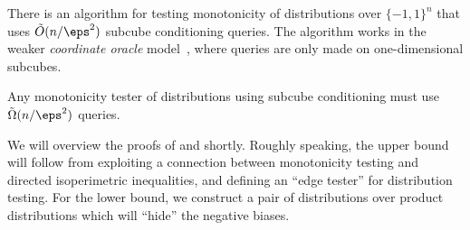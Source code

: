 \begin{theorem}\label{thm:intro-ub}
There is an algorithm for testing monotonicity of distributions over $\{-1,1\}^n$ that uses $\tilde{O}(n/\eps^2)$ subcube conditioning queries. The algorithm works in the weaker \emph{coordinate oracle} model~\cite{BCSV23}, where queries are only made on one-dimensional subcubes.
\end{theorem}


\begin{theorem}\label{thm:intro-lb}
Any monotonicity tester of distributions using subcube conditioning must use $\tilde{\Omega}(n/\eps^2)$ queries.
\end{theorem}

We will overview the proofs of  and  shortly. Roughly speaking, the upper bound will follow from exploiting a connection between monotonicity testing and directed isoperimetric inequalities, and defining an ``edge tester'' for distribution testing. For the lower bound, we construct a pair of distributions over product distributions which will ``hide'' the negative biases. 

